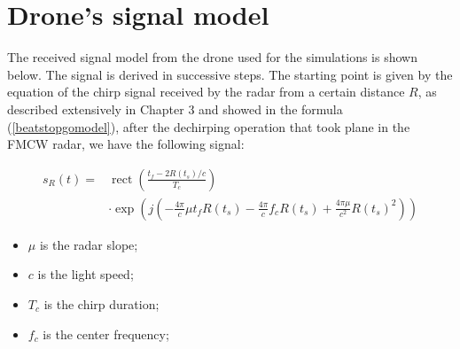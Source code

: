 \section{Drone's signal model}
The received signal model from the drone used for the simulations is shown below. The signal is derived in successive steps. The starting point is given by the equation of the chirp signal received by the radar from a certain distance $R$, as described extensively in Chapter 3 and showed in the formula (\ref{beatstopgomodel}), after the dechirping operation that took plane in the FMCW radar, we have the following signal:

\begin{equation}
\begin{aligned}
s_{R}(t)=& \operatorname{rect}\left(\frac{t_{f}-2 R\left(t_{s}\right) / c}{T_{c}}\right) \\
& \cdot \exp \left(j\left(-\frac{4 \pi}{c} \mu t_{f} R\left(t_{s}\right)-\frac{4 \pi}{c} f_{c} R\left(t_{s}\right)+\frac{4 \pi \mu}{c^{2}} R\left(t_{s}\right)^{2}\right)\right)
\end{aligned}
\label{start_formula_model_signal}
\end{equation}

\begin{itemize}
    \item $\mu$  is the radar slope;
    
    \item $c$ is the light speed;
         
    \item $T_{c}$ is the chirp duration;

    \item $f_{c}$ is the center frequency;

\end{itemize}

